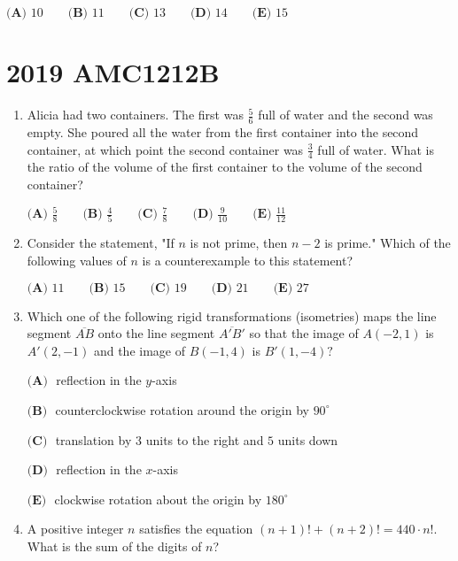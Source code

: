 \documentclass{article}
\begin{document}
\begin{enumerate}[label=\arabic*., itemsep=0.5em]
$\textbf{(A) } 10 \qquad \textbf{(B) }11 \qquad \textbf{(C) } 13\qquad \textbf{(D) } 14 \qquad \textbf{(E) } 15$\par \vspace{0.5em}\end{enumerate}\newpage\section*{2019 AMC1212B}\begin{enumerate}[label=\arabic*., itemsep=0.5em]\item Alicia had two containers. The first was $\tfrac{5}{6}$ full of water and the second was empty. She poured all the water from the first container into the second container, at which point the second container was $\tfrac{3}{4}$ full of water. What is the ratio of the volume of the first container to the volume of the second container?

$\textbf{(A) } \frac{5}{8} \qquad \textbf{(B) } \frac{4}{5} \qquad \textbf{(C) } \frac{7}{8} \qquad \textbf{(D) } \frac{9}{10} \qquad \textbf{(E) } \frac{11}{12}$\par \vspace{0.5em}\item Consider the statement, "If $n$ is not prime, then $n-2$ is prime." Which of the following values of $n$ is a counterexample to this statement?

$\textbf{(A) } 11 \qquad \textbf{(B) } 15 \qquad \textbf{(C) } 19 \qquad \textbf{(D) } 21 \qquad \textbf{(E) } 27$\par \vspace{0.5em}\item Which one of the following rigid transformations (isometries) maps the line segment $\overline{AB}$ onto the line segment $\overline{A'B'}$ so that the image of $A(-2,1)$ is $A'(2,-1)$ and the image of $B(-1,4)$ is $B'(1,-4)?$

$\textbf{(A) } $ reflection in the $y$-axis

$\textbf{(B) } $ counterclockwise rotation around the origin by $90^{\circ}$

$\textbf{(C) } $ translation by $3$ units to the right and $5$ units down

$\textbf{(D) } $ reflection in the $x$-axis

$\textbf{(E) } $ clockwise rotation about the origin by $180^{\circ}$\par \vspace{0.5em}\item A positive integer $n$ satisfies the equation $(n+1)!+(n+2)!=440\cdot n!$. What is the sum of the digits of $n$?


\end{enumerate}
\end{document}
